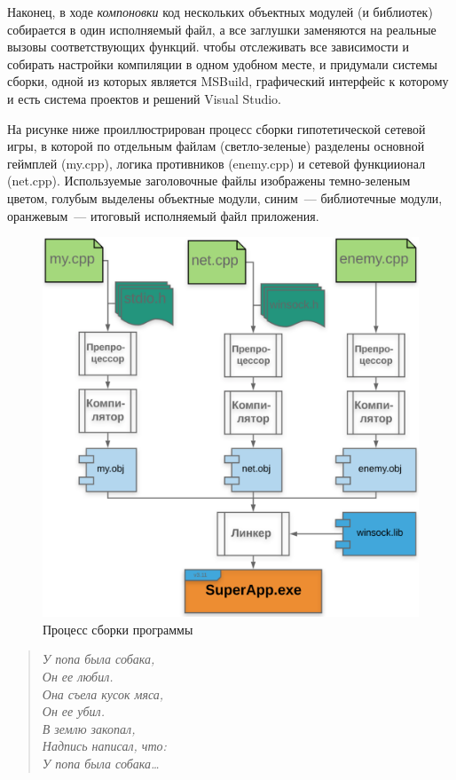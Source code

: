\documentclass{article}
\begin{document}
Наконец, в ходе \emph{компоновки} код нескольких объектных модулей (и библиотек) собирается в один исполняемый файл, а все заглушки заменяются на реальные вызовы соответствующих функций. чтобы отслеживать все зависимости и собирать настройки компиляции в одном удобном месте, и придумали системы сборки, одной из которых является MSBuild, графический интерфейс к которому и есть система проектов и решений Visual Studio.

На рисунке ниже проиллюстрирован процесс сборки гипотетической сетевой игры, в которой по отдельным файлам (светло-зеленые) разделены основной геймплей (my.cpp), логика противников (enemy.cpp) и сетевой функциионал (net.cpp). Используемые заголовочные файлы изображены темно-зеленым цветом, голубым выделены объектные модули, синим~--- библиотечные модули, оранжевым~--- итоговый исполняемый файл приложения. 





\begin{figure}
\includegraphics[scale=0.5]{link.png}
\caption{Процесс сборки программы}
\end{figure}






\newpage
\begin{verse}
\small\it
У попа была собака,\\
Он ее любил.\\
Она съела кусок мяса,\\
Он ее убил.\\
В землю закопал, \\
Надпись написал, что:\\
У попа была собака\ldots
\end{verse}
\end{document}
